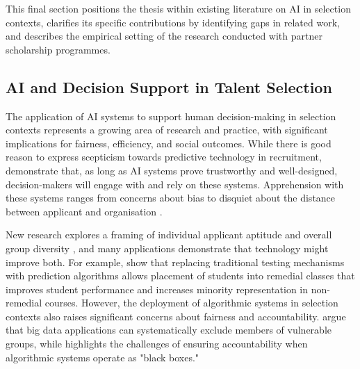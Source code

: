 This final section positions the thesis within existing literature on AI in selection contexts, clarifies its specific contributions by identifying gaps in related work, and describes the empirical setting of the research conducted with partner scholarship programmes.

\subsection{AI and Decision Support in Talent Selection}\label{ssec:context_ai_talent_selection}
The application of AI systems to support human decision-making in selection contexts represents a growing area of research and practice, with significant implications for fairness, efficiency, and social outcomes. While there is good reason to express scepticism towards predictive technology in recruitment, \textcite{Vereschak_Alizadeh_Bailly_Caramiaux_2024} demonstrate that, as long as AI systems prove trustworthy and well-designed, decision-makers will engage with and rely on these systems. Apprehension with these systems ranges from concerns about bias to disquiet about the distance between applicant and organisation \cite{Lashkari_Cheng_2023}.

New research explores a framing of individual applicant aptitude and overall group diversity \cite{noray2023systemic}, and many applications demonstrate that technology might improve both. For example, \textcite{bergman2021seven} show that replacing traditional testing mechanisms with prediction algorithms allows placement of students into remedial classes that improves student performance and increases minority representation in non-remedial courses. However, the deployment of algorithmic systems in selection contexts also raises significant concerns about fairness and accountability. \textcite{barocas_big_2016} argue that big data applications can systematically exclude members of vulnerable groups, while \textcite{pasquale2015black} highlights the challenges of ensuring accountability when algorithmic systems operate as "black boxes."

